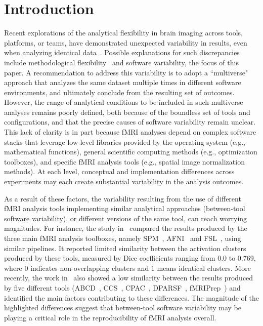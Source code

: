 \documentclass[11pt,onecolumn]{article}
\begin{document}
\section{Introduction}

Recent explorations of the analytical flexibility in brain imaging across
tools, platforms, or teams, have demonstrated unexpected variability in
results, even when analyzing identical data~\cite{botvinik2020variability}. Possible explanations for
such discrepancies include methodological flexibility~\cite{carp2012plurality} and software
variability, the focus of this paper. A recommendation to address this
variability is to adopt a ``multiverse" approach that analyzes the same
dataset multiple times in different software environments, and ultimately
conclude from the resulting set of outcomes. However, the range of
analytical conditions to be included in such multiverse analyses remains
poorly defined, both because of the boundless set of tools and
configurations, and that the precise causes of software variability remain
unclear. This lack of clarity is in part because fMRI analyses depend on
complex software stacks that leverage low-level libraries provided by the
operating system (e.g., mathematical functions), general scientific
computing methods (e.g., optimization toolboxes), and specific fMRI
analysis tools (e.g., spatial image normalization methods). At each level,
conceptual and implementation differences across experiments may each
create substantial variability in the analysis outcomes.

As a result of these factors, the variability resulting from the use of
different fMRI analysis tools implementing similar analytical approaches
(between-tool software variability), or different versions of the same tool,
 can reach worrying magnitudes. For instance, the
study in~\cite{bowring2019exploring} compared the results produced by the
three main fMRI analysis toolboxes, namely SPM~\cite{penny2011statistical},
AFNI~\cite{cox1996afni} and FSL~\cite{jenkinson2012fsl}, using similar
pipelines. It reported limited similarity between the activation clusters
produced by these tools, measured by Dice coefficients ranging from 0.0 to
0.769, where 0 indicates non-overlapping
clusters and 1 means identical clusters. More recently, the work
in~\cite{Li2021.12.01.470790} also showed a low similarity between the
results produced by five different tools (ABCD~\cite{feczko2021adolescent},
CCS~\cite{xu2015connectome}, CPAC~\cite{craddock2013towards}, DPARSF~\cite{yan2010dparsf},
fMRIPrep~\cite{esteban2019fmriprep}) and identified the main
factors contributing to these differences. The magnitude of the highlighted
differences suggest that between-tool software variability may be playing a critical
role in the reproducibility of  fMRI analysis overall. 
\end{document}
